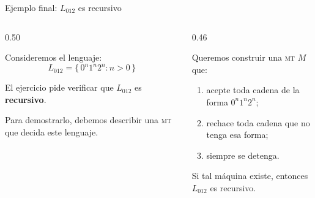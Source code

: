 \documentclass[aspectratio=1610, 12pt]{beamer}
\newcommand{\MT}{\textsc{mt}}
\begin{document}
\begin{frame}[t]{Ejemplo final: $L_{012}$ es recursivo}
\vspace{4pt}
\begin{columns}[T]

  \begin{column}{0.50\textwidth}
    \begin{exbox}[Planteamiento]
      \footnotesize
      Consideremos el lenguaje:
      \[
        L_{012}=\{\,0^n1^n2^n : n>0\,\}
      \]

      \vspace{3pt}
      El ejercicio pide verificar que $L_{012}$ es
      \textbf{recursivo}.

      \vspace{4pt}
      Para demostrarlo, debemos describir una \MT{} que
      decida este lenguaje.
    \end{exbox}
  \end{column}

  \begin{column}{0.46\textwidth}
    \begin{defbox}[Objetivo]
      \footnotesize
      Queremos construir una \MT{} $M$ que:

      \begin{enumerate}\setlength{\itemsep}{3pt}
        \item acepte toda cadena de la forma $0^n1^n2^n$;

        \item rechace toda cadena que no tenga esa forma;

        \item siempre se detenga.
      \end{enumerate}

      \vspace{4pt}
      Si tal máquina existe, entonces $L_{012}$ es recursivo.
    \end{defbox}
  \end{column}

\end{columns}
\end{frame}
\end{document}
